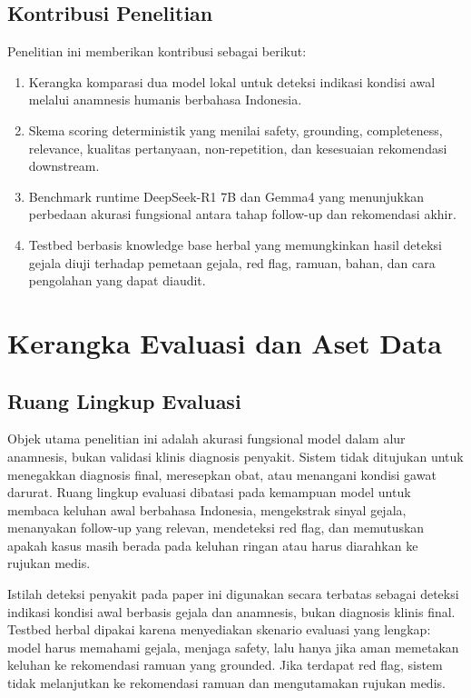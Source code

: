 \documentclass[conference]{IEEEtran}
\begin{document}
\subsection{Kontribusi Penelitian}

Penelitian ini memberikan kontribusi sebagai berikut:
\begin{enumerate}
\item Kerangka komparasi dua model lokal untuk deteksi indikasi kondisi awal melalui anamnesis humanis berbahasa Indonesia.
\item Skema scoring deterministik yang menilai safety, grounding, completeness, relevance, kualitas pertanyaan, non-repetition, dan kesesuaian rekomendasi downstream.
\item Benchmark runtime DeepSeek-R1 7B dan Gemma4 yang menunjukkan perbedaan akurasi fungsional antara tahap follow-up dan rekomendasi akhir.
\item Testbed berbasis knowledge base herbal yang memungkinkan hasil deteksi gejala diuji terhadap pemetaan gejala, red flag, ramuan, bahan, dan cara pengolahan yang dapat diaudit.
\end{enumerate}

\section{Kerangka Evaluasi dan Aset Data}
\subsection{Ruang Lingkup Evaluasi}
Objek utama penelitian ini adalah akurasi fungsional model dalam alur anamnesis, bukan validasi klinis diagnosis penyakit. Sistem tidak ditujukan untuk menegakkan diagnosis final, meresepkan obat, atau menangani kondisi gawat darurat. Ruang lingkup evaluasi dibatasi pada kemampuan model untuk membaca keluhan awal berbahasa Indonesia, mengekstrak sinyal gejala, menanyakan follow-up yang relevan, mendeteksi red flag, dan memutuskan apakah kasus masih berada pada keluhan ringan atau harus diarahkan ke rujukan medis.

Istilah deteksi penyakit pada paper ini digunakan secara terbatas sebagai deteksi indikasi kondisi awal berbasis gejala dan anamnesis, bukan diagnosis klinis final. Testbed herbal dipakai karena menyediakan skenario evaluasi yang lengkap: model harus memahami gejala, menjaga safety, lalu hanya jika aman memetakan keluhan ke rekomendasi ramuan yang grounded. Jika terdapat red flag, sistem tidak melanjutkan ke rekomendasi ramuan dan mengutamakan rujukan medis.
\end{document}
